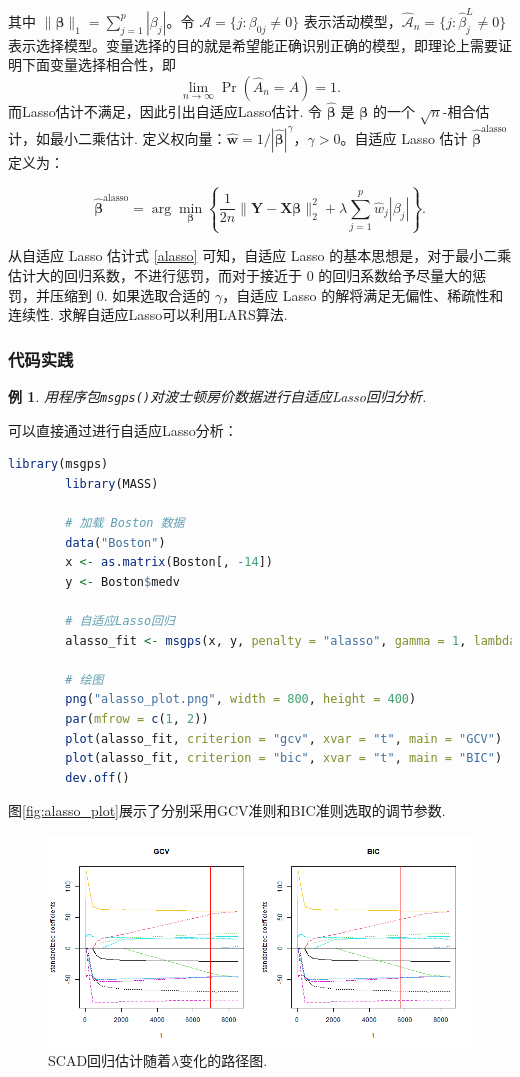 \documentclass[12pt, a4paper, oneside]{ctexart}
\newtheorem{example}[theorem]{例}
\begin{document}
	其中 $\|\bm{\beta} \|_1 = \sum_{j=1}^{p} |\beta_j|$。令 $\mathcal{A} = \{j : \beta_{0j} \ne 0\}$ 表示活动模型，$\hat{\mathcal{A}}_n = \{j : \hat{\beta}_j^L \ne 0\}$ 表示选择模型。变量选择的目的就是希望能正确识别正确的模型，即理论上需要证明下面变量选择相合性，即
	\[
	\lim_{n \to \infty} \Pr(\hat{A}_n = A) = 1.
	\]
	而Lasso估计不满足，因此引出自适应Lasso估计.
	令 $\hat{\bm{\beta}}$ 是 $\bm{\beta}$ 的一个 $\sqrt{n}$-相合估计，如最小二乘估计. 定义权向量：$\hat{\bm{w}} = 1 / |\hat{\bm{\beta}}|^{\gamma}$，$\gamma > 0$。自适应 Lasso 估计 $\hat{\bm{\beta}}^{\text{alasso}}$ 定义为：
	
	\begin{equation}
		\hat{\bm{\beta}}^{\text{alasso}} = \arg \min_{\bm{\beta}} \left\{ \frac{1}{2n} \|\bm{Y} - \bm{X}\bm{\beta}\|_2^2 + \lambda \sum_{j=1}^{p} \hat{w}_j |\beta_j| \right\}. \label{alasso}
	\end{equation}
	
	从自适应 Lasso 估计式 \eqref{alasso} 可知，自适应 Lasso 的基本思想是，对于最小二乘估计大的回归系数，不进行惩罚，而对于接近于 0 的回归系数给予尽量大的惩罚，并压缩到 0. 如果选取合适的 $\gamma$，自适应 Lasso 的解将满足无偏性、稀疏性和连续性. 求解自适应Lasso可以利用LARS算法.
	
	\subsubsection{代码实践}
	\begin{example}
		用程序包\texttt{msgps()}对波士顿房价数据进行自适应Lasso回归分析.
	\end{example}
	
	可以直接通过进行自适应Lasso分析：
	\begin{lstlisting}[language=R]
		library(msgps)
		library(MASS)
		
		# 加载 Boston 数据
		data("Boston")
		x <- as.matrix(Boston[, -14])
		y <- Boston$medv
		
		# 自适应Lasso回归
		alasso_fit <- msgps(x, y, penalty = "alasso", gamma = 1, lambda = 0)
		
		# 绘图
		png("alasso_plot.png", width = 800, height = 400)
		par(mfrow = c(1, 2))
		plot(alasso_fit, criterion = "gcv", xvar = "t", main = "GCV")
		plot(alasso_fit, criterion = "bic", xvar = "t", main = "BIC")
		dev.off()
	\end{lstlisting}
	图\eqref{fig:alasso_plot}展示了分别采用GCV准则和BIC准则选取的调节参数.
	\begin{figure}[H]
		\small
		\centering
		\includegraphics[width=0.8\columnwidth]{../Figure/alasso_plot.png}
		\caption{SCAD回归估计随着$\lambda$变化的路径图.}
		\label{fig:alasso_plot}
	\end{figure}
	
\end{document}
